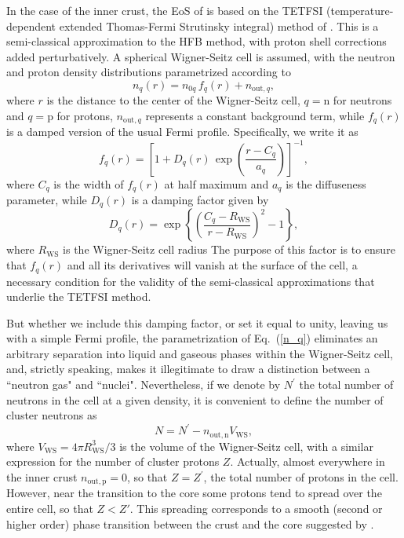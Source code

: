 \documentclass{aa}
\newcommand{\RWS}{R_\mathrm{WS}}
\begin{document}
In the case of the inner crust, the EoS of
\citet{Pearson-ea12} is based on the TETFSI
(temperature-dependent extended Thomas-Fermi Strutinsky
integral) method of \citet{Onsi-ea08}. This is a
semi-classical approximation to the
HFB method, with proton shell
corrections added perturbatively. A spherical Wigner-Seitz
cell is assumed, with the neutron and proton density
distributions parametrized according to
\begin{equation}
   n_q(r) = n_{0q}\,f_q(r) + n_{\mathrm{out},q},
\label{n_q}
\end{equation}
where $r$ is the distance to the center of the Wigner-Seitz
cell, $q={}$n for 
neutrons and $q={}$p for protons, $n_{\mathrm{out},q}$ represents
a constant background term, while $f_q(r)$ is a damped version of the usual
Fermi profile. Specifically, we write it as 
\begin{equation}
   f_q(r) = \left[1+D_q(r)\,\exp\left(\frac{r-C_q}{a_q}\right) \right]^{-1},
\label{nucform}
\end{equation}
where $C_q$ is the width of $f_q(r)$ at half maximum and $a_q$ is the
diffuseness parameter, while $D_q(r)$ is a damping factor given by
\begin{equation}
\label{damp}
D_q(r) = \exp\left\{\left(\frac{C_q-\RWS}{r-\RWS}\right)^2
-1 \right\} ,
\end{equation}
where  $\RWS$ is the Wigner-Seitz cell radius The purpose of
this factor is to ensure that $f_q(r)$ and all its
derivatives will vanish at the surface of the cell, a
necessary condition for the validity of the semi-classical
approximations that underlie the TETFSI method. 

But whether we include this damping factor, or set it equal to unity, leaving
us with a simple Fermi profile, the parametrization of Eq.~(\ref{n_q})
eliminates an arbitrary separation into liquid and gaseous phases within the 
Wigner-Seitz cell, and, strictly speaking, makes it illegitimate to draw a
distinction between a ``neutron gas" and ``nuclei". Nevertheless, if we denote
by $N^\prime$ the total number of neutrons in the cell at a given density, it
is convenient to define the number of cluster neutrons as
\begin{equation}
N = N^\prime - n_{\mathrm{out,n}}V_\mathrm{WS}, 
\end{equation}
where $V_\mathrm{WS}=4\pi\RWS^3/3$ is the volume of the
Wigner-Seitz cell, with a similar  expression for the number
of cluster protons $Z$. Actually, almost everywhere in the
inner crust $n_{\mathrm{out,p}} = 0$, so that $Z =
Z^\prime$, the total number of protons in the cell. However,
near the transition to the core some  protons tend to spread
over the entire cell, so that $Z<Z'$. This spreading
corresponds to a smooth (second or higher order) phase
transition between the  crust and the core suggested by
\citet{Pearson-ea12}.
 
\end{document}
